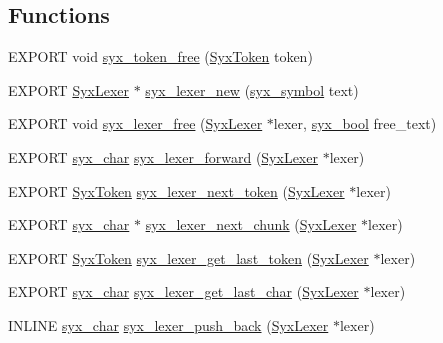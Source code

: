 \subsection*{Functions}
\begin{CompactItemize}
\item 
EXPORT void \hyperlink{syx-lexer_8h_61906561dfa01694449abc504d9b913a}{syx\_\-token\_\-free} (\hyperlink{struct_syx_token}{SyxToken} token)
\item 
EXPORT \hyperlink{struct_syx_lexer}{SyxLexer} $\ast$ \hyperlink{syx-lexer_8h_0550b17d25c07c2b437d37b380f3571d}{syx\_\-lexer\_\-new} (\hyperlink{syx-types_8h_9663af54b7b72f5d8be5f754ef356525}{syx\_\-symbol} text)
\item 
EXPORT void \hyperlink{syx-lexer_8h_a895ca7c0e097297c327c10ab7d78453}{syx\_\-lexer\_\-free} (\hyperlink{struct_syx_lexer}{SyxLexer} $\ast$lexer, \hyperlink{syx-types_8h_c6dc09b276b99fa1956364359139daab}{syx\_\-bool} free\_\-text)
\item 
EXPORT \hyperlink{syx-types_8h_22636fad803dd674d2640c323df20a11}{syx\_\-char} \hyperlink{syx-lexer_8h_4bbe34b294fb616df37253f173686153}{syx\_\-lexer\_\-forward} (\hyperlink{struct_syx_lexer}{SyxLexer} $\ast$lexer)
\item 
EXPORT \hyperlink{struct_syx_token}{SyxToken} \hyperlink{syx-lexer_8h_3d9cd96e5073feeb727cf1e53db5a7c0}{syx\_\-lexer\_\-next\_\-token} (\hyperlink{struct_syx_lexer}{SyxLexer} $\ast$lexer)
\item 
EXPORT \hyperlink{syx-types_8h_22636fad803dd674d2640c323df20a11}{syx\_\-char} $\ast$ \hyperlink{syx-lexer_8h_061a773b9e83d79b82913bc1397afb6d}{syx\_\-lexer\_\-next\_\-chunk} (\hyperlink{struct_syx_lexer}{SyxLexer} $\ast$lexer)
\item 
EXPORT \hyperlink{struct_syx_token}{SyxToken} \hyperlink{syx-lexer_8h_010af7219d1223881638a38172df9a06}{syx\_\-lexer\_\-get\_\-last\_\-token} (\hyperlink{struct_syx_lexer}{SyxLexer} $\ast$lexer)
\item 
EXPORT \hyperlink{syx-types_8h_22636fad803dd674d2640c323df20a11}{syx\_\-char} \hyperlink{syx-lexer_8h_427fcf294782c171cf9e225cfce99881}{syx\_\-lexer\_\-get\_\-last\_\-char} (\hyperlink{struct_syx_lexer}{SyxLexer} $\ast$lexer)
\item 
INLINE \hyperlink{syx-types_8h_22636fad803dd674d2640c323df20a11}{syx\_\-char} \hyperlink{syx-lexer_8h_c2161d821b8fa1df61846b0864e216ae}{syx\_\-lexer\_\-push\_\-back} (\hyperlink{struct_syx_lexer}{SyxLexer} $\ast$lexer)
\end{CompactItemize}


